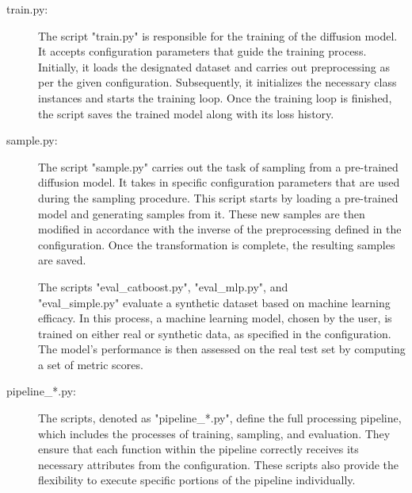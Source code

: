 \begin{description}
	\item[train.py:]
		The script "train.py" is responsible for the training of the diffusion model. 
		It accepts configuration parameters that guide the training process. 
		Initially, it loads the designated dataset and carries out preprocessing as per the given configuration. 
		Subsequently, it initializes the necessary class instances and starts the training loop. 
		Once the training loop is finished, the script saves the trained model along with its loss history.

	\item[sample.py:]
		The script "sample.py" carries out the task of sampling from a pre-trained diffusion model. 
		It takes in specific configuration parameters that are used during the sampling procedure. 
		This script starts by loading a pre-trained model and generating samples from it. 
		These new samples are then modified in accordance with the inverse of the preprocessing defined in the configuration.
		Once the transformation is complete, the resulting samples are saved.

	\item[]
		The scripts "eval\_catboost.py", "eval\_mlp.py", and \\"eval\_simple.py" evaluate a synthetic dataset based on machine learning efficacy. 
		In this process, a machine learning model, chosen by the user, is trained on either real or synthetic data, as specified in the configuration. 
		The model's performance is then assessed on the real test set by computing a set of metric scores.

	\item[pipeline\_*.py\footnotemark:]
		The scripts, denoted as "pipeline\_*.py", define the full processing pipeline, which includes the processes of training, sampling, and evaluation. 
		They ensure that each function within the pipeline correctly receives its necessary attributes from the configuration. 
		These scripts also provide the flexibility to execute specific portions of the pipeline individually.


\end{description}
